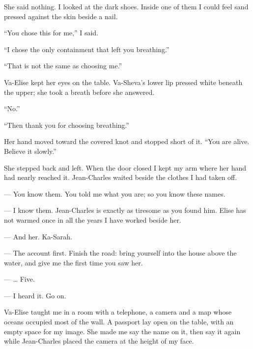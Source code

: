 She said nothing. I looked at the dark shoes. Inside one of them I could feel sand pressed against the skin beside a nail.\par

``You chose this for me,'' I said.\par

``I chose the only containment that left you breathing.''\par

``That is not the same as choosing me.''\par

Va-Elise kept her eyes on the table. Va-Sheva's lower lip pressed white beneath the upper; she took a breath before she answered.\par

``No.''\par

``Then thank you for choosing breathing.''\par

Her hand moved toward the covered knot and stopped short of it. ``You are alive. Believe it slowly.''\par

She stepped back and left. When the door closed I kept my arm where her hand had nearly reached it. Jean-Charles waited beside the clothes I had taken off.\par

\ornament

\begin{room}

--- You know them. You told me what you are; so you know these names.

--- I know them. Jean-Charles is exactly as tiresome as you found him. Elise has not warmed once in all the years I have worked beside her.

--- And her. Ka-Sarah.

--- The account first. Finish the road: bring yourself into the house above the water, and give me the first time you saw her.

--- \ldots{} Five.

--- I heard it. Go on.

\end{room}

\ornament

Va-Elise taught me in a room with a telephone, a camera and a map whose oceans occupied most of the wall. A passport lay open on the table, with an empty space for my image. She made me say the name on it, then say it again while Jean-Charles placed the camera at the height of my face.\par


